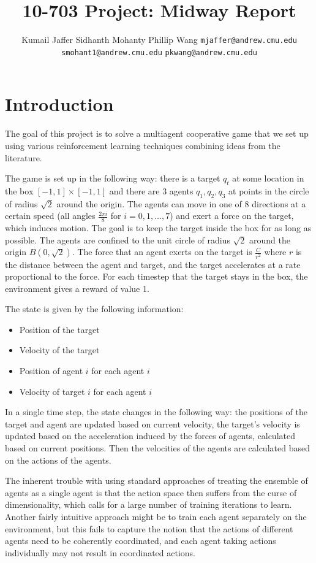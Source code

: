 \documentclass{article}
\title{10-703 Project: Midway Report}
\author{Kumail Jaffer \And Sidhanth Mohanty \And Phillip
Wang
\AND
\texttt{mjaffer@andrew.cmu.edu} \And
\texttt{smohant1@andrew.cmu.edu}\And
\texttt{pkwang@andrew.cmu.edu}}
\begin{document}
\maketitle

\section{Introduction}
The goal of this project is to solve a multiagent
cooperative game that we set up using various
reinforcement learning techniques combining ideas
from the literature.

The game is set up in the following way: there is a target
$q_t$ at some location in the box $[-1,1]\times[-1,1]$
and there are 3 agents $q_1,q_2,q_3$ at points in the circle of
radius $\sqrt{2}$ around the origin. The agents can move
in one of 8 directions at a certain speed (all angles
$\frac{2\pi i}{8}$ for $i=0,1,\ldots,7$) and exert a force
on the target, which induces motion. The goal is to
keep the target inside the box for as long as possible.
The agents are confined to the unit circle of radius
$\sqrt{2}$ around the origin $B(0,\sqrt{2})$.
The force that an agent exerts on the target is $\frac{C}{r^2}$
where $r$ is the distance between the agent and target, and
the target accelerates at a rate proportional to the force.
For each timestep that the target stays in the box, the
environment gives a reward of value 1.

The state is given by the following information:
\begin{itemize}
\item Position of the target
\item Velocity of the target
\item Position of agent $i$ for each agent $i$
\item Velocity of target $i$ for each agent $i$
\end{itemize}

In a single time step, the state changes in the following way:
the positions of the target and agent are updated based on
current velocity, the target's velocity is updated
based on the acceleration induced by the forces
of agents, calculated based on current positions. Then the
velocities of the agents are calculated based on the
actions of the agents.

The inherent trouble with using standard approaches of treating
the ensemble of agents as a single agent is that the action
space then suffers from the curse of dimensionality, which
calls for a large number of training iterations to
learn. Another fairly intuitive approach might be to
train each agent separately on the environment, but
this fails to capture the notion that the actions of
different agents need to be coherently coordinated,
and each agent taking actions individually may not
result in coordinated actions.
\end{document}
